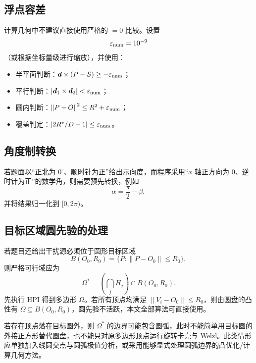 \documentclass[UTF8,12pt,a4paper]{ctexart}
\theoremstyle{definition}
\newcommand{\eps}{\varepsilon}
\newcommand{\norm}[1]{\left\lVert #1\right\rVert}
\newcommand{\abs}[1]{\left\lvert #1\right\rvert}
\newcommand{\cross}{\mathbin{\times}}
\begin{document}
\subsection{浮点容差}

计算几何中不建议直接使用严格的 $=0$ 比较。设置
\[
\eps_{\rm num}=10^{-9}
\]
（或根据坐标量级进行缩放），并使用：
\begin{itemize}
  \item 半平面判断：$\bm d\cross(P-S)\ge-\eps_{\rm num}$；
  \item 平行判断：$\abs{\bm d_1\cross\bm d_2}<\eps_{\rm num}$；
  \item 圆内判断：$\norm{P-O}^2\le R^2+\eps_{\rm num}$；
  \item 覆盖判定：$\abs{2R^*/D-1}\le\eps_{\rm num}$。
\end{itemize}

\subsection{角度制转换}

若题面以“正北为 $0^\circ$、顺时针为正”给出示向度，而程序采用“$x$ 轴正方向为 $0$、逆时针为正”的数学角，则需要预先转换，例如
\begin{equation}
\alpha=\frac{\pi}{2}-\beta,
\end{equation}
并将结果归一化到 $[0,2\pi)$。

\subsection{目标区域圆先验的处理}

若题目还给出干扰源必须位于圆形目标区域
\begin{equation}
B(O_0,R_0)=\{P:\norm{P-O_0}\le R_0\},
\end{equation}
则严格可行域应为
\begin{equation}
\Omega^*=\left(\bigcap_jH_j\right)\cap B(O_0,R_0).
\label{eq:target-disk}
\end{equation}
先执行 HPI 得到多边形 $\Omega$。若所有顶点均满足 $\norm{V_i-O_0}\le R_0$，则由圆盘的凸性有 $\Omega\subseteq B(O_0,R_0)$，圆先验不活跃，本文全部算法可直接使用。

若存在顶点落在目标圆外，则 $\Omega^*$ 的边界可能包含圆弧，此时不能简单用目标圆的外接正方形替代圆盘，也不能只对原多边形顶点运行旋转卡壳与 Welzl。此类情形应单独加入线圆交点与圆弧极值分析，或采用能够显式处理圆弧边界的凸优化/计算几何方法。

\end{document}
